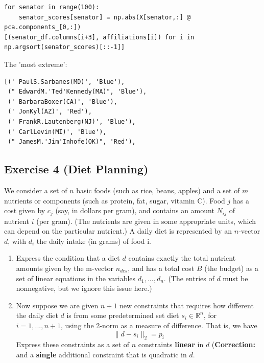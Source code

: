 \documentclass[11pt]{article}
\begin{document}
\begin{solution}
\begin{enumerate}
\begin{verbatim}
for senator in range(100):
    senator_scores[senator] = np.abs(X[senator,:] @ pca.components_[0,:])
[(senator_df.columns[i+3], affiliations[i]) for i in np.argsort(senator_scores)[::-1]]
\end{verbatim}
The 'most extreme':
\begin{verbatim}
[(' PaulS.Sarbanes(MD)', 'Blue'),
 (" EdwardM.'Ted'Kennedy(MA)", 'Blue'),
 (' BarbaraBoxer(CA)', 'Blue'),
 (' JonKyl(AZ)', 'Red'),
 (' FrankR.Lautenberg(NJ)', 'Blue'),
 (' CarlLevin(MI)', 'Blue'),
 (" JamesM.'Jim'Inhofe(OK)", 'Red'),
\end{verbatim}
\end{enumerate}
\end{solution}

\newpage
\subsection*{Exercise 4 (Diet Planning)}

We consider a set of $n$ basic foods (such as rice, beans, apples) and a set of $m$ nutrients or components (such as protein, fat, sugar, vitamin C). Food $j$ has a cost given by $c_j$ (say, in dollars per gram), and contains an amount $N_{ij}$ of nutrient $i$ (per gram). (The nutrients are given in some appropriate units, which can depend on the particular nutrient.) A daily diet is represented by an $n$-vector $d$, with $d_i$ the daily intake (in grams) of food i.

\begin{enumerate}
    \item Express the condition that a diet $d$ contains exactly the total nutrient amounts given by the m-vector $n_{des}$, and has a total cost $B$ (the budget) as a set of linear equations in the variables $d_1, ..., d_n$. (The entries of $d$ must be nonnegative, but we ignore this issue here.)

    \item Now suppose we are given $n + 1$ new constraints that requires how different the daily diet $d$ is from some predetermined set diet $s_i \in \mathbb{R}^n$, for $i = 1, ..., n+1$, using the 2-norm as a measure of difference. That is, we have
    $$
    \| d - s_i \|_2 = p_i
    $$
    Express these constraints as a set of $n$ constraints \textbf{linear} in $d$ (\textbf{Correction:} and a \textbf{single} additional constraint that is quadratic in $d$.
\end{enumerate}
\end{document}
